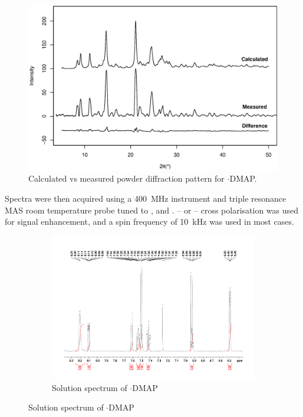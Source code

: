 \begin{refsection}
\begin{figure}
    \centering
    \includegraphics[width=0.9\linewidth]{Figures/ebs-4ome-dmap-pdx.eps}
    \caption{Calculated vs measured powder diffraction pattern for $ \cdot $DMAP.}\label{fig:ebs-4ome-dmap-pdx}
\end{figure}

Spectra were then acquired using a 400~MHz instrument and triple resonance MAS room temperature probe tuned to ,  and  .
-- or -- cross polarisation was used for signal enhancement, and a spin frequency of 10~kHz was used in most cases.

\begin{figure}
  \centering
  \begin{subfigure}[t]{\linewidth}
  \centering
  \includegraphics[width=0.9\linewidth]{Figures/ebs-4ome-dmap-sol-1h.pdf}
  \caption{Solution  spectrum of $ \cdot $DMAP}\label{fig:ebs-4ome-dmap-sol-1h}
  \end{subfigure}


\end{figure}
\end{refsection}
